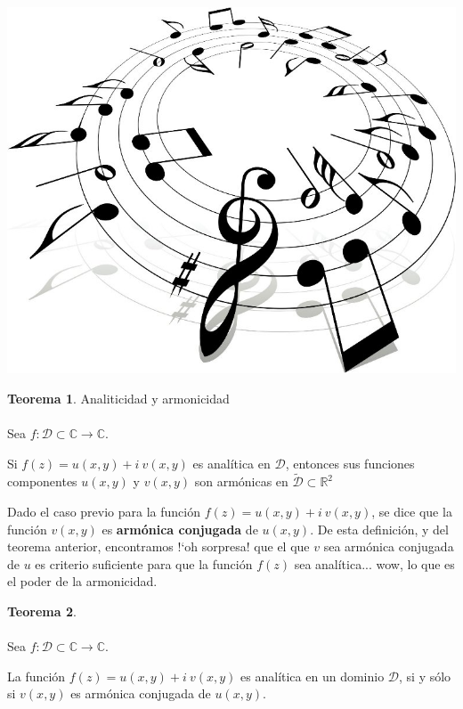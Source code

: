\documentclass[12pt]{article}
\theoremstyle{definition}
\theoremstyle{theorem}
\newtheorem{theorem}{Teorema}[section]
\theoremstyle{corolary}
\begin{document}
\begin{center}
	\includegraphics[scale=0.3]{armonia_musical.jpg}
\end{center}


\colorbox{yellow!40!white!80}{\parbox{\linewidth}{
\theoremstyle{theorem}
\begin{theorem} {Analiticidad y armonicidad}
\\ \\
Sea $f : \mathcal{D}\subset \mathbb{C} \rightarrow \mathbb{C}$.

Si $f(z)=u(x, y) + i\ v(x, y)$ es anal\'itica en $\mathcal{D}$, entonces sus funciones componentes $u(x, y)$ y $v(x, y)$ son arm\'onicas en $\tilde{\mathcal{D}}\subset \mathbb{R}^2$

\end{theorem}}}
\linebreak
\linebreak

Dado el caso previo para la funci\'on $f(z)=u(x, y) + i\ v(x, y)$, se dice que la funci\'on $v(x, y)$ es \textbf{arm\'onica conjugada} de $u(x,y)$. De esta definici\'on, y del teorema anterior, encontramos !`oh sorpresa! que el que $v$ sea arm\'onica conjugada de $u$ es criterio suficiente para que la funci\'on $f(z)$ sea anal\'itica... wow, lo que es el poder de la armonicidad.\\

\colorbox{yellow!40!white!80}{\parbox{\linewidth}{
\theoremstyle{theorem}
\begin{theorem} {\ }
\\ \\
Sea $f : \mathcal{D}\subset \mathbb{C} \rightarrow \mathbb{C}$.

La funci\'on $f(z)=u(x, y) + i\ v(x, y)$ es anal\'itica en un dominio $\mathcal{D}$, si y s\'olo si $v(x, y)$ es arm\'onica conjugada de $u(x, y)$.

\end{theorem}}}
\linebreak
\linebreak
\end{document}
